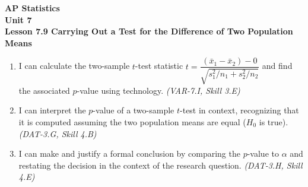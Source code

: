 \documentclass[10pt]{article}
\begin{document}
\vspace{-0.8in}

\begin{center}
  {\color{white}\textbf{\LARGE AP Statistics}}\\[4pt]
  {\color{skymid}\large\textbf{Unit 7}}\\[6pt]
  {\color{white}\textbf{\large Lesson 7.9 \quad Carrying Out a Test for the Difference of Two Population Means}}
\end{center}

\vspace{0.22in}
\namedateperiod
\vspace{0.18in}

\begin{learningtargetbox}
\small
\begin{enumerate}[leftmargin=1.5em, itemsep=5pt]
  \item I can calculate the two-sample $t$-test statistic
        $t = \dfrac{(\bar x_1 - \bar x_2) - 0}{\sqrt{s_1^2/n_1 + s_2^2/n_2}}$
        and find the associated $p$-value using technology.
        \textit{(VAR-7.I, Skill 3.E)}
  \item I can interpret the $p$-value of a two-sample $t$-test in context, recognizing
        that it is computed assuming the two population means are equal ($H_0$ is true).
        \textit{(DAT-3.G, Skill 4.B)}
  \item I can make and justify a formal conclusion by comparing the $p$-value to $\alpha$
        and restating the decision in the context of the research question.
        \textit{(DAT-3.H, Skill 4.E)}
\end{enumerate}
\end{learningtargetbox}

\vspace{0.14in}
\end{document}
